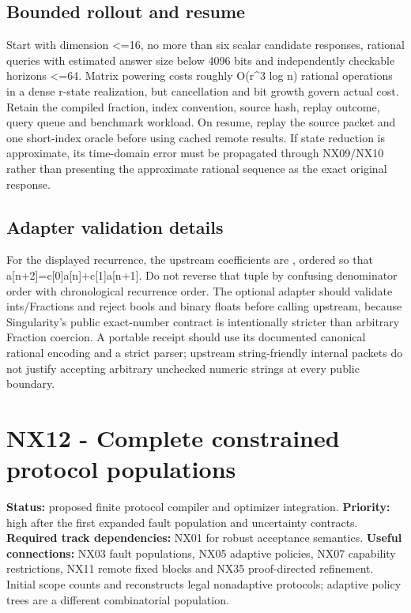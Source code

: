 \documentclass[
  11pt,
  a4paper,
]{report}
\let\nxtexttt\texttt
\renewcommand{\texttt}[1]{\nxtexttt{\seqsplit{#1}}}
\begin{document}
\hypertarget{bounded-rollout-and-resume}{%
\section{Bounded rollout and resume}\label{bounded-rollout-and-resume}}

Start with dimension \textless=16, no more than six scalar candidate
responses, rational queries with estimated answer size below 4096 bits
and independently checkable horizons \textless=64. Matrix powering costs
roughly O(r\^{}3 log n) rational operations in a dense r-state
realization, but cancellation and bit growth govern actual cost. Retain
the compiled fraction, index convention, source hash, replay outcome,
query queue and benchmark workload. On resume, replay the source packet
and one short-index oracle before using cached remote results. If state
reduction is approximate, its time-domain error must be propagated
through NX09/NX10 rather than presenting the approximate rational
sequence as the exact original response.

\hypertarget{adapter-validation-details}{%
\section{Adapter validation details}\label{adapter-validation-details}}

For the displayed recurrence, the upstream \texttt{from\_recurrence}
coefficients are \texttt{(-1/6,\ 5/6)}, ordered so that
a{[}n+2{]}=c{[}0{]}a{[}n{]}+c{[}1{]}a{[}n+1{]}. Do not reverse that
tuple by confusing denominator order with chronological recurrence
order. The optional adapter should validate ints/Fractions and reject
bools and binary floats before calling upstream, because Singularity's
public exact-number contract is intentionally stricter than arbitrary
Fraction coercion. A portable receipt should use its documented
canonical rational encoding and a strict parser; upstream
string-friendly internal packets do not justify accepting arbitrary
unchecked numeric strings at every public boundary.

\hypertarget{nx12---complete-constrained-protocol-populations}{%
\chapter{NX12 - Complete constrained protocol
populations}\label{nx12---complete-constrained-protocol-populations}}

\textbf{Status:} proposed finite protocol compiler and optimizer
integration. \textbf{Priority:} high after the first expanded fault
population and uncertainty contracts. \textbf{Required track
dependencies:} NX01 for robust acceptance semantics. \textbf{Useful
connections:} NX03 fault populations, NX05 adaptive policies, NX07
capability restrictions, NX11 remote fixed blocks and NX35
proof-directed refinement. Initial scope counts and reconstructs legal
nonadaptive protocols; adaptive policy trees are a different
combinatorial population.
\end{document}

